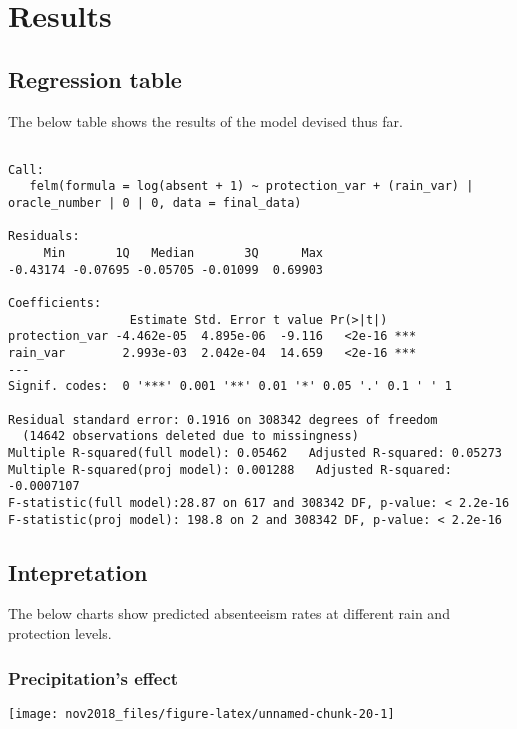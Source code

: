 \documentclass[]{article}
\begin{document}
\section{Results}\label{results}

\subsection{Regression table}\label{regression-table}

The below table shows the results of the model devised thus far.

\begin{verbatim}

Call:
   felm(formula = log(absent + 1) ~ protection_var + (rain_var) |      oracle_number | 0 | 0, data = final_data) 

Residuals:
     Min       1Q   Median       3Q      Max 
-0.43174 -0.07695 -0.05705 -0.01099  0.69903 

Coefficients:
                 Estimate Std. Error t value Pr(>|t|)    
protection_var -4.462e-05  4.895e-06  -9.116   <2e-16 ***
rain_var        2.993e-03  2.042e-04  14.659   <2e-16 ***
---
Signif. codes:  0 '***' 0.001 '**' 0.01 '*' 0.05 '.' 0.1 ' ' 1

Residual standard error: 0.1916 on 308342 degrees of freedom
  (14642 observations deleted due to missingness)
Multiple R-squared(full model): 0.05462   Adjusted R-squared: 0.05273 
Multiple R-squared(proj model): 0.001288   Adjusted R-squared: -0.0007107 
F-statistic(full model):28.87 on 617 and 308342 DF, p-value: < 2.2e-16 
F-statistic(proj model): 198.8 on 2 and 308342 DF, p-value: < 2.2e-16 
\end{verbatim}

\subsection{Intepretation}\label{intepretation}

The below charts show predicted absenteeism rates at different rain and
protection levels.

\subsubsection{Precipitation's effect}\label{precipitations-effect}

\begin{center}\texttt{[image: nov2018\_files/figure-latex/unnamed-chunk-20-1]} \end{center}
\end{document}
